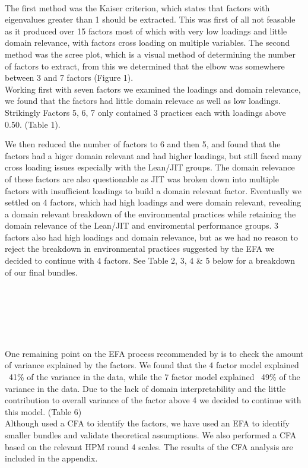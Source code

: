 \\
The first method was the Kaiser criterion, which states that factors with eigenvalues greater than 1 should be extracted.
This was first of all not feasable as it produced over 15 factors most of which with very low loadings and little domain relevance, with factors cross loading on multiple variables.
The second method was the scree plot, which is a visual method of determining the number of factors to extract, from this we determined that the elbow was somewhere between 3 and 7 factors (Figure 1). 
\\ 
Working first with seven factors we examined the loadings and domain relevance, we found that the factors had little domain relevace as well as low loadings. Strikingly Factors 5, 6, 7 only contained 3 practices each with loadings above 0.50. (Table 1).

We then reduced the number of factors to 6 and then 5, and found that the factors had a higer domain relevant and had higher loadings, but still faced many cross loading issues especially with the Lean/JIT groups.
The domain relevance of these factors are also questionable as JIT was broken down into multiple factors with insufficient loadings to build a domain relevant factor.
Eventually we settled on 4 factors, which had high loadings and were domain relevant, revealing a domain relevant breakdown of the environmental practices while retaining the domain relevance of the Lean/JIT and enviromental performance groups.
3 factors also had high loadings and domain relevance, but as we had no reason to reject the breakdown in environmental practices suggested by the EFA we decided to continue with 4 factors. See Table 2, 3, 4 \& 5 below for a breakdown of our final bundles.
 \\
 \\
 \\
 \\\\
 \\\\
One remaining point on the EFA process recommended by \citep{beaversPracticalConsiderationsUsing2013} is to check the amount of variance explained by the factors.
We found that the 4 factor model explained ~41\% of the variance in the data, while the 7 factor model explained ~49\% of the variance in the data.
Due to the lack of domain interpretability and the little contribution to overall variance of the factor above 4 we decided to continue with this model. (Table 6)
\\
Although \citep{furlanComplementarityLeanManufacturing2011} used a CFA to identify the factors, we have used an EFA to identify smaller bundles and validate theoretical assumptions. We also performed a CFA based on the relevant HPM round 4 scales. The results of the CFA analysis are included in the appendix.
